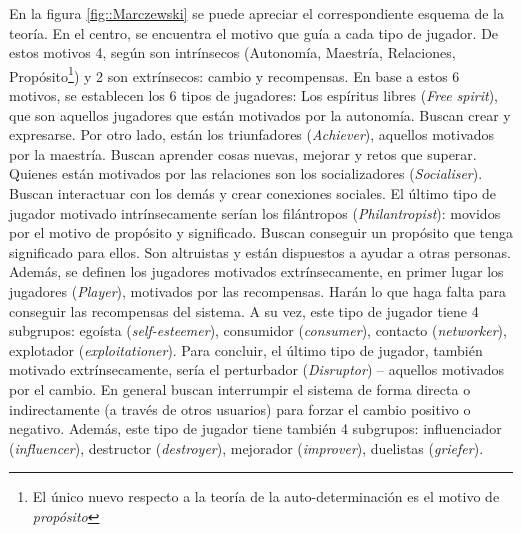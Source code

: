 En la figura \ref{fig::Marczewski} se puede apreciar el correspondiente esquema de la teoría.
%
En el centro, se encuentra el motivo que guía a cada tipo de jugador. 
%
De estos motivos 4, según  \cite{marczewski} son intrínsecos (Autonomía, Maestría, Relaciones, Propósito\footnote{El único nuevo respecto a la teoría de la auto-determinación  \cite{SDT} es el motivo de \textit{propósito}}) y 2 son extrínsecos: cambio y recompensas.
%
En base a estos 6 motivos, se establecen los 6 tipos de jugadores:
%
Los espíritus libres (\textit{Free spirit}), que son aquellos jugadores que están motivados por la autonomía. Buscan crear y expresarse.
%
Por otro lado, están los triunfadores (\textit{Achiever}), aquellos motivados por la maestría. 
%
Buscan aprender cosas nuevas, mejorar y retos que superar.
%
Quienes están motivados por las relaciones son los socializadores (\textit{Socialiser}).
%
Buscan interactuar con los demás y crear conexiones sociales.
%
El último tipo de jugador motivado intrínsecamente serían los filántropos (\textit{Philantropist}): movidos por el motivo de propósito y significado.
%
Buscan conseguir un propósito que tenga  significado para ellos.
%
Son altruistas y están dispuestos a ayudar a otras personas.
%
Además, se definen los jugadores motivados extrínsecamente, en primer lugar los jugadores (\textit{Player}), motivados por las recompensas. 
%
Harán lo que haga falta para conseguir las recompensas del sistema.
%
A su vez, este tipo de jugador tiene 4 subgrupos: egoísta (\textit{self-esteemer}), consumidor (\textit{consumer}), contacto (\textit{networker}), explotador (\textit{exploitationer}).
%
Para concluir, el último tipo de jugador, también motivado extrínsecamente, sería el perturbador (\textit{Disruptor}) -- aquellos motivados por el cambio. 
%
En general buscan interrumpir el sistema de forma directa o indirectamente (a través de otros usuarios) para forzar el cambio positivo o negativo.
%
Además, este tipo de jugador tiene también 4 subgrupos: influenciador (\textit{influencer}), destructor (\textit{destroyer}), mejorador (\textit{improver}), duelistas (\textit{griefer}).


